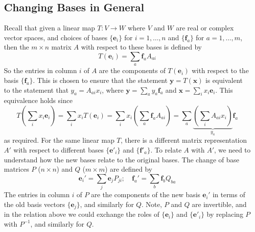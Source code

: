 \documentclass{article}
\begin{document}
	\subsection{Changing Bases in General}
	Recall that given a linear map $T\colon V \to W$ where $V$ and $W$ are real or complex vector spaces, and choices of bases $\{ \bm e_i \}$ for $i = 1, \dots, n$ and $\{\bm f_a \}$ for $a = 1, \dots, m$, then the $m \times n$ matrix $A$ with respect to these bases is defined by
	\[ T(\bm e_i) = \sum_a \bm f_a A_{ai} \]
	So the entries in column $i$ of $A$ are the components of $T(\bm e_i)$ with respect to the basis $\{ \bm f_a \}$. This is chosen to ensure that the statement $\bm y = T(\bm x)$ is equivalent to the statement that $y_a = A_{ai}x_i$, where $\bm y = \sum_a y_a \bm f_a$ and $\bm x = \sum_i x_i \bm e_i$. This equivalence holds since
	\[ T\left(\sum_i x_i \bm e_i \right) = \sum_i x_i T(\bm e_i) = \sum_i x_i \left( \sum_a \bm f_a A_{ai} \right) = \sum_a \underbrace{\left( \sum_i A_{ai} x_i \right)}_{y_a} \bm f_a \]
	as required. For the same linear map $T$, there is a different matrix representation $A'$ with respect to different bases $\{ \bm e'_i \}$ and $\{ \bm f'_a \}$. To relate $A$ with $A'$, we need to understand how the new bases relate to the original bases. The change of base matrices $P$ ($n \times n$) and $Q$ ($m \times m$) are defined by
	\[ \bm e_i' = \sum_j \bm e_j P_{ji};\quad \bm f_a' = \sum_b \bm f_b Q_{ba} \]
	The entries in column $i$ of $P$ are the components of the new basis $\bm e_i'$ in terms of the old basis vectors $\{ \bm e_j \}$, and similarly for $Q$. Note, $P$ and $Q$ are invertible, and in the relation above we could exchange the roles of $\{ \bm e_i \}$ and $\{ \bm e'_i \}$ by replacing $P$ with $P^{-1}$, and similarly for $Q$.
\end{document}
